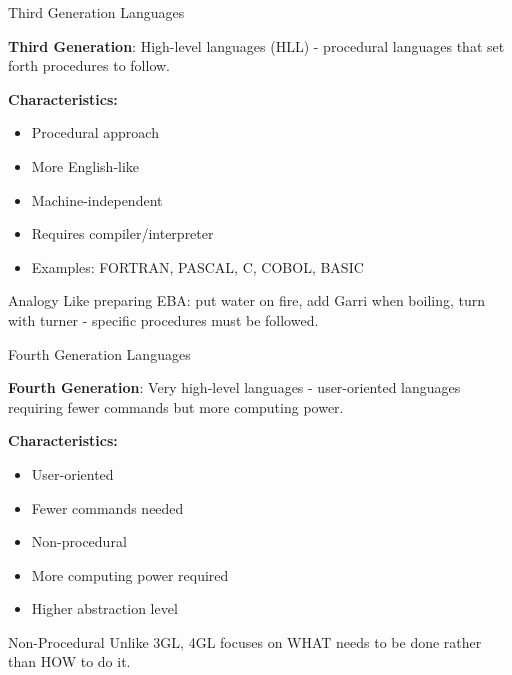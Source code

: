 \documentclass[aspectratio=169]{beamer}
\begin{document}
\begin{frame}{Third Generation Languages}
    \begin{definition}
        \textbf{Third Generation}: High-level languages (HLL) - procedural languages that set forth procedures to follow.
    \end{definition}
    
    \vspace{0.3cm}
    \textbf{Characteristics:}
    \begin{itemize}
        \item Procedural approach
        \item More English-like
        \item Machine-independent
        \item Requires compiler/interpreter
        \item Examples: FORTRAN, PASCAL, C, COBOL, BASIC
    \end{itemize}
    
    \vspace{0.2cm}
    \begin{exampleblock}{Analogy}
        Like preparing EBA: put water on fire, add Garri when boiling, turn with turner - specific procedures must be followed.
    \end{exampleblock}
\end{frame}

\begin{frame}{Fourth Generation Languages}
    \begin{definition}
        \textbf{Fourth Generation}: Very high-level languages - user-oriented languages requiring fewer commands but more computing power.
    \end{definition}
    
    \vspace{0.3cm}
    \textbf{Characteristics:}
    \begin{itemize}
        \item User-oriented
        \item Fewer commands needed
        \item Non-procedural
        \item More computing power required
        \item Higher abstraction level
    \end{itemize}
    
    \vspace{0.2cm}
    \begin{alertblock}{Non-Procedural}
        Unlike 3GL, 4GL focuses on WHAT needs to be done rather than HOW to do it.
    \end{alertblock}
\end{frame}
\end{document}
